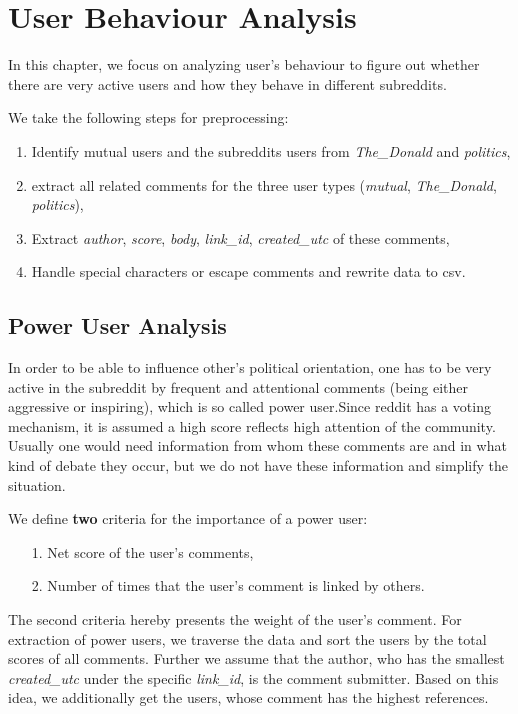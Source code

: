 \documentclass[runningheads,a4paper]{llncs}
\begin{document}
	\section{User Behaviour Analysis}
	
	
	In this chapter, we focus on analyzing user's behaviour to figure out whether there are very active users and how they behave in different subreddits.
	
	We take the following steps for preprocessing:
	\begin{enumerate}
		\item Identify mutual users and the subreddits users from \textit{The\_Donald} and \textit{politics},
		\item extract all related comments for the three user types (\textit{mutual}, \textit{The\_Donald}, \textit{politics}),
		\item Extract \textit{author}, \textit{score}, \textit{body}, \textit{link\_id}, \textit{created\_utc} of these comments,
		\item Handle special characters or escape comments and rewrite data to csv.
	\end{enumerate}
	
	\subsection{Power User Analysis}
	In order to be able to influence other's political orientation, one has to be very active in the subreddit by frequent and attentional comments (being either aggressive or inspiring), which is so called power user.Since reddit has a voting mechanism, it is assumed a high score reflects high attention of the community. Usually one would need information from whom these comments are and in what kind of debate they occur, but we do not have these information and simplify the situation.
	
	We define \textbf{two} criteria for the importance of a power user:
	\begin{itemize}
		\item[1.] Net score of the user's comments,
		\item[2.] Number of times that the user's comment is linked by others.
	\end{itemize}
	The second criteria hereby presents the weight of the user's comment.
	For extraction of power users, we traverse the data and sort the users by the total scores of all comments.
	Further we assume that the author, who has the smallest \textit{created\_utc} under the specific \textit{link\_id}, is the comment submitter.
	Based on this idea, we additionally get the users, whose comment has the highest references.
\end{document}
